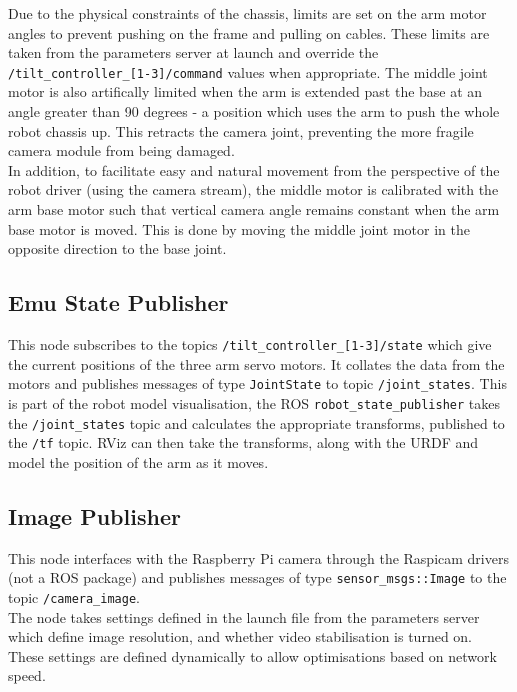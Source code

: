 \documentclass[titlepage,12pt,a4paper]{article}
\begin{document}
\noindent Due to the physical constraints of the chassis, limits are set on the arm motor angles to prevent pushing on the frame and pulling on cables. These limits are taken from the parameters server at launch and override the \texttt{/tilt\_controller\_[1-3]/command} values when appropriate. The middle joint motor is also artifically limited when the arm is extended past the base at an angle greater than 90 degrees - a position which uses the arm to push the whole robot chassis up. This retracts the camera joint, preventing the more fragile camera module from being damaged.\\

\noindent In addition, to facilitate easy and natural movement from the perspective of the robot driver (using the camera stream), the middle motor is calibrated with the arm base motor such that vertical camera angle remains constant when the arm base motor is moved. This is done by moving the middle joint motor in the opposite direction to the base joint.\\

\subsection{Emu State Publisher}
This node subscribes to the topics \texttt{/tilt\_controller\_[1-3]/state} which give the current positions of the three arm servo motors. It collates the data from the motors and publishes messages of type \texttt{JointState} to topic \texttt{/joint\_states}. This is part of the robot model visualisation, the ROS \texttt{robot\_state\_publisher} takes the \texttt{/joint\_states} topic and calculates the appropriate transforms, published to the \texttt{/tf} topic. RViz can then take the transforms, along with the URDF and model the position of the arm as it moves. \\

\subsection{Image Publisher}
This node interfaces with the Raspberry Pi camera through the Raspicam drivers (not a ROS package) and publishes messages of type \texttt{sensor\_msgs::Image} to the topic \texttt{/camera\_image}.\\

\noindent The node takes settings defined in the launch file from the parameters server which define image resolution, and whether video stabilisation is turned on. These settings are defined dynamically to allow optimisations based on network speed.\\
\end{document}
